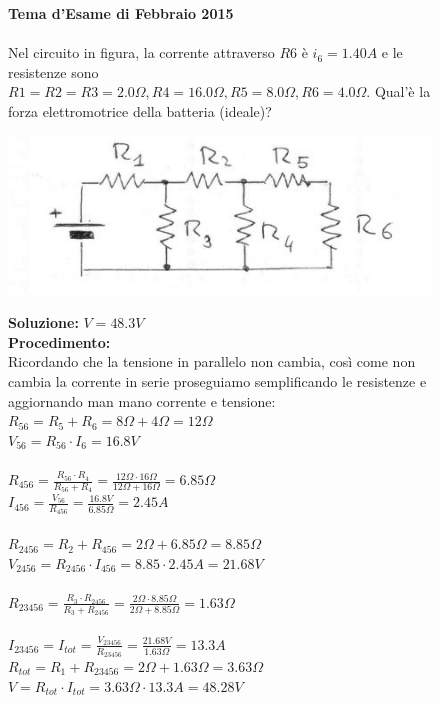 \begin{figure}[h!]
\textbf{Tema d'Esame di Febbraio 2015}\\ \\
 Nel circuito in figura, la corrente attraverso $R6$ è $i_6=1.40A$ e le resistenze sono
$R1=R2=R3=2.0\Omega, R4= 16.0\Omega, R5= 8.0 \Omega , R6= 4.0 \Omega$. Qual'è la forza elettromotrice della batteria (ideale)?
\begin{center}
		\includegraphics[scale=0.8]{ES5/FEB052015.jpg}
	\end{center}

	\begin{boxed}
		\null\hfill \textbf{Soluzione:} $V = 48.3 V$\\
		\textbf{Procedimento: } \\
		Ricordando che la tensione in parallelo non cambia, così come non cambia la corrente in serie proseguiamo semplificando le resistenze e aggiornando man mano corrente e tensione:\\
		$R_{56}=R_5 + R_6=8\Omega + 4\Omega=12\Omega$\\
		$V_{56}=R_{56}\cdot I_6=16.8V$\\\\
		$R_{456}=\frac{R_{56}\cdot R_4}{R_{56}+R_4}=\frac{12\Omega\cdot 16\Omega}{12\Omega + 16\Omega}=6.85\Omega$\\
		$I_{456}=\frac{V_{56}}{R_{456}}=\frac{16.8V}{6.85\Omega}=2.45A$\\ \\
		$R_{2456}=R_2+R_{456}=2\Omega+6.85\Omega=8.85\Omega$\\
		$V_{2456}=R_{2456}\cdot I_{456}=8.85\cdot 2.45A=21.68V$\\ \\
		$R_{23456}=\frac{R_3\cdot R_{2456}}{R_3+ R_{2456}}=\frac{2\Omega \cdot 8.85\Omega}{2\Omega+ 8.85\Omega}=1.63\Omega$\\ \\
		$I_{23456}=I_{tot}=\frac{V_{23456}}{R_{23456}}=\frac{21.68V}{1.63\Omega}=13.3A$\\
		$R_{tot}=R_1+R_{23456}=2\Omega+1.63\Omega=3.63\Omega$\\
		$V=R_{tot}\cdot I_{tot}=3.63\Omega \cdot13.3A=48.28V$
	\end{boxed}
\end{figure}

